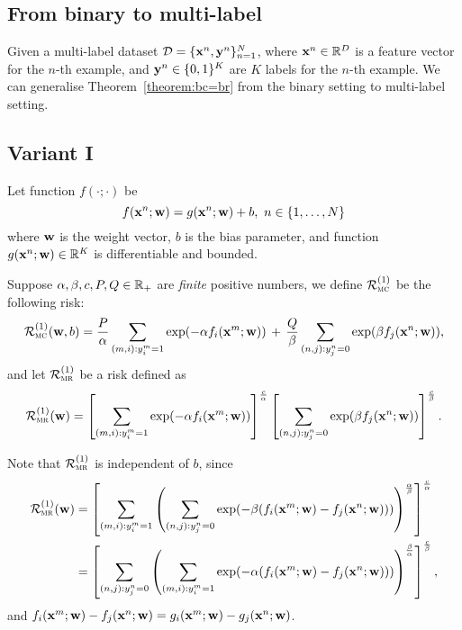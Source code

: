 \subsection{From binary to multi-label}
\label{ssec:ml}

Given a multi-label dataset $\mathcal{D} = \{\mathbf{x}^n, \mathbf{y}^n\}_{n=1}^N$, where $\mathbf{x}^n \in \mathbb{R}^D$ is a feature vector for the $n$-th example,
and $\mathbf{y}^n \in \{0,1\}^K$ are $K$ labels for the $n$-th example.
We can generalise Theorem~\ref{theorem:bc=br} from the binary setting to multi-label setting.

\subsection{Variant I}

Let function $f(\cdot; \cdot)$ be
$$
f(\mathbf{x}^n; \mathbf{w}) = g(\mathbf{x}^n; \mathbf{w}) + b, \ n \in \{1,\dots,N\}
$$
where $\mathbf{w}$ is the weight vector, $b$ is the bias parameter,
and function $g(\mathbf{x}^n; \mathbf{w}) \in \mathbb{R}^K$ is differentiable and bounded.

Suppose $\alpha, \beta, c, P, Q \in \mathbb{R}_+$ are \emph{finite} positive numbers, 
we define $\mathcal{R}_\textsc{mc}^{({1})}$ be the following risk:
\begin{equation}
\label{eq:mc1}
\displaystyle
\mathcal{R}_\textsc{mc}^{({1})}(\mathbf{w}, b) 
= \frac{P}{\alpha} \sum_{(m,i): y_i^m = 1} \exp(-\alpha f_i(\mathbf{x}^m; \mathbf{w})) \, + \,
  \frac{Q}{\beta}  \sum_{(n,j): y_j^n = 0} \exp( \beta  f_j(\mathbf{x}^n; \mathbf{w})),
\end{equation}
and let $\mathcal{R}_\textsc{mr}^{({1})}$ be a risk defined as
\begin{equation}
\label{eq:mr1}
\displaystyle
\mathcal{R}_\textsc{mr}^{({1})}(\mathbf{w}) 
= \left[ \sum_{(m,i): y_i^m = 1} \exp(-\alpha f_i(\mathbf{x}^m; \mathbf{w})) \right]^\frac{c}{\alpha}  
  \left[ \sum_{(n,j): y_j^n = 0} \exp( \beta  f_j(\mathbf{x}^n; \mathbf{w})) \right]^\frac{c}{\beta}.
\end{equation}

Note that $\mathcal{R}_\textsc{mr}^{({1})}$ is independent of $b$, since
\begin{equation}
\label{eq:mr_derive}
\displaystyle
\begin{aligned}
\mathcal{R}_\textsc{mr}^{({1})}(\mathbf{w}) 
&= \left[ \sum_{(m,i): y_i^m = 1} \left( \sum_{(n,j): y_j^n = 0} 
   \exp(-\beta(f_i(\mathbf{x}^m; \mathbf{w}) - f_j(\mathbf{x}^n; \mathbf{w}) ) ) \right)^\frac{\alpha}{\beta} \right]^\frac{c}{\alpha} \\
&= \left[ \sum_{(n,j): y_j^n = 0} \left( \sum_{(m,i): y_i^m = 1} 
   \exp(-\alpha( f_i(\mathbf{x}^m; \mathbf{w}) - f_j(\mathbf{x}^n; \mathbf{w}) ) ) \right)^\frac{\beta}{\alpha} \right]^\frac{c}{\beta},
\end{aligned}
\end{equation}
and $f_i(\mathbf{x}^m; \mathbf{w}) - f_j(\mathbf{x}^n; \mathbf{w}) = g_i(\mathbf{x}^m; \mathbf{w}) - g_j(\mathbf{x}^n; \mathbf{w})$.


